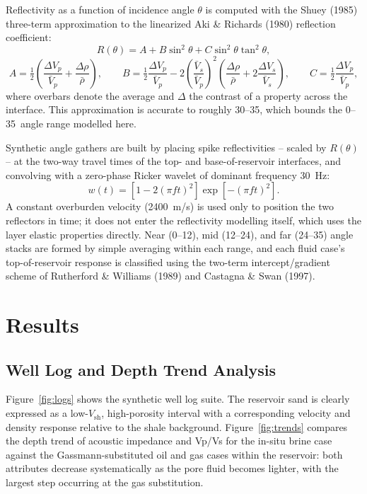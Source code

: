 \documentclass[11pt]{article}
\begin{document}
Reflectivity as a function of incidence angle \(\theta\) is computed with the Shuey (1985) three-term approximation to the linearized Aki \& Richards (1980) reflection coefficient:
\[
R(\theta) = A + B\sin^2\theta + C\sin^2\theta\tan^2\theta,
\]
\[
A = \tfrac{1}{2}\left(\frac{\Delta V_p}{\bar V_p} + \frac{\Delta\rho}{\bar\rho}\right), \qquad
B = \tfrac{1}{2}\frac{\Delta V_p}{\bar V_p} - 2\left(\frac{\bar V_s}{\bar V_p}\right)^2\left(\frac{\Delta\rho}{\bar\rho} + 2\frac{\Delta V_s}{\bar V_s}\right), \qquad
C = \tfrac{1}{2}\frac{\Delta V_p}{\bar V_p},
\]
where overbars denote the average and \(\Delta\) the contrast of a property across the interface. This approximation is accurate to roughly 30--35\textdegree, which bounds the 0--35\textdegree\ angle range modelled here.

Synthetic angle gathers are built by placing spike reflectivities -- scaled by \(R(\theta)\) -- at the two-way travel times of the top- and base-of-reservoir interfaces, and convolving with a zero-phase Ricker wavelet of dominant frequency 30~Hz:
\[
w(t) = \left[1-2(\pi f t)^2\right]\exp\left[-(\pi f t)^2\right].
\]
A constant overburden velocity (2400~m/s) is used only to position the two reflectors in time; it does not enter the reflectivity modelling itself, which uses the layer elastic properties directly. Near (0--12\textdegree), mid (12--24\textdegree), and far (24--35\textdegree) angle stacks are formed by simple averaging within each range, and each fluid case's top-of-reservoir response is classified using the two-term intercept/gradient scheme of Rutherford \& Williams (1989) and Castagna \& Swan (1997).

\section{Results}

\subsection{Well Log and Depth Trend Analysis}

Figure~\ref{fig:logs} shows the synthetic well log suite. The reservoir sand is clearly expressed as a low-\(V_\mathrm{sh}\), high-porosity interval with a corresponding velocity and density response relative to the shale background. Figure~\ref{fig:trends} compares the depth trend of acoustic impedance and Vp/Vs for the in-situ brine case against the Gassmann-substituted oil and gas cases within the reservoir: both attributes decrease systematically as the pore fluid becomes lighter, with the largest step occurring at the gas substitution.
\end{document}
